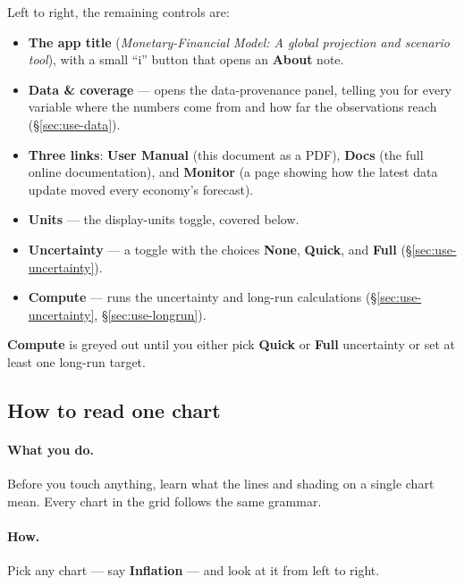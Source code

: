 \documentclass[11pt]{article}
\theoremstyle{definition}
\theoremstyle{remark}
\begin{document}
Left to right, the remaining controls are:
\begin{itemize}
  \item \textbf{The app title} (\emph{Monetary-Financial Model: A global projection and
    scenario tool}), with a small ``i'' button that opens an \textbf{About} note.
  \item \textbf{Data \& coverage} --- opens the data-provenance panel, telling you for every
    variable where the numbers come from and how far the observations reach
    (\S\ref{sec:use-data}).
  \item \textbf{Three links}: \textbf{User Manual} (this document as a PDF), \textbf{Docs}
    (the full online documentation), and \textbf{Monitor} (a page showing how the latest data
    update moved every economy's forecast).
  \item \textbf{Units} --- the display-units toggle, covered below.
  \item \textbf{Uncertainty} --- a toggle with the choices \textbf{None}, \textbf{Quick}, and
    \textbf{Full} (\S\ref{sec:use-uncertainty}).
  \item \textbf{Compute} --- runs the uncertainty and long-run calculations
    (\S\ref{sec:use-uncertainty}, \S\ref{sec:use-longrun}).
\end{itemize}
\textbf{Compute} is greyed out until you either pick \textbf{Quick} or \textbf{Full}
uncertainty or set at least one long-run target.

\subsection{How to read one chart}

\paragraph{What you do.} Before you touch anything, learn what the lines and shading on a single
chart mean. Every chart in the grid follows the same grammar.

\paragraph{How.} Pick any chart --- say \textbf{Inflation} --- and look at it from left to right.
\end{document}
